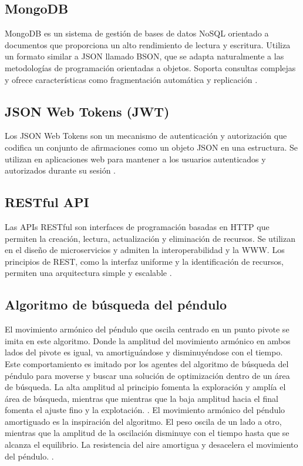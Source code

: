 \documentclass[conference]{IEEEtran}
\begin{document}
\subsection{MongoDB}
MongoDB es un sistema de gestión de bases de datos NoSQL orientado a documentos
que proporciona un alto rendimiento de lectura y escritura. Utiliza un formato
similar a JSON llamado BSON, que se adapta naturalmente a las metodologías de
programación orientadas a objetos. Soporta consultas complejas y ofrece
características como fragmentación automática y replicación
\cite{krishnan2016}.

\subsection{JSON Web Tokens (JWT)}
Los JSON Web Tokens son un mecanismo de autenticación y autorización que
codifica un conjunto de afirmaciones como un objeto JSON en una estructura. Se
utilizan en aplicaciones web para mantener a los usuarios autenticados y
autorizados durante su sesión \cite{IETF2015}.

\subsection{RESTful API}
Las APIs RESTful son interfaces de programación basadas en HTTP que permiten la
creación, lectura, actualización y eliminación de recursos. Se utilizan en el
diseño de microservicios y admiten la interoperabilidad y la WWW. Los
principios de REST, como la interfaz uniforme y la identificación de recursos,
permiten una arquitectura simple y escalable \cite{ehsan2022}.

\subsection{Algoritmo de búsqueda del péndulo}
El movimiento armónico del péndulo que oscila centrado en un punto pivote se
imita en este algoritmo. Donde la amplitud del movimiento armónico en ambos
lados del pivote es igual, va amortiguándose y disminuyéndose con el tiempo.
Este comportamiento es imitado por los agentes del algoritmo de búsqueda del
péndulo para moverse y buscar una solución de optimización dentro de un área de
búsqueda. La alta amplitud al principio fomenta la exploración y amplía el área
de búsqueda, mientras que mientras que la baja amplitud hacia el final fomenta
el ajuste fino y la explotación. \cite{aziz2022}.
El movimiento armónico del péndulo amortiguado es la inspiración del algoritmo.
El peso oscila de un lado a otro, mientras que la amplitud de la oscilación
disminuye con el tiempo hasta que se alcanza el equilibrio. La resistencia del
aire amortigua y desacelera el movimiento del péndulo. \cite{aziz2022}.
\end{document}
